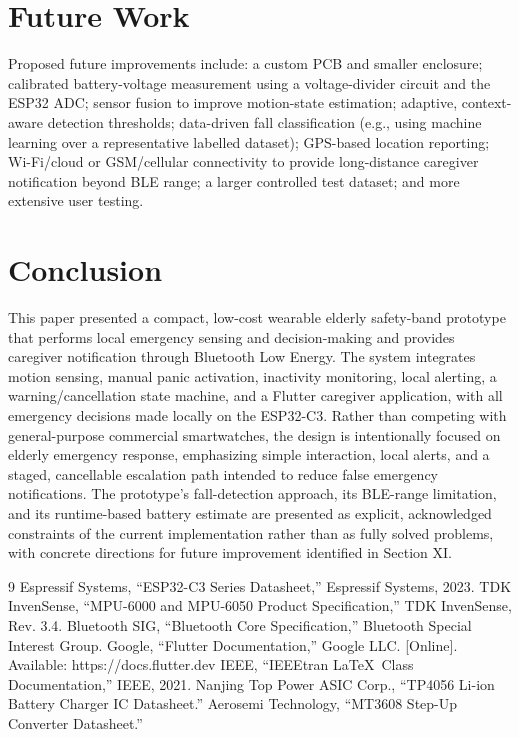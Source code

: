 \documentclass[lettersize,journal]{IEEEtran}
\begin{document}
\section{Future Work}
Proposed future improvements include: a custom PCB and smaller enclosure; calibrated battery-voltage measurement using a voltage-divider circuit and the ESP32 ADC; sensor fusion to improve motion-state estimation; adaptive, context-aware detection thresholds; data-driven fall classification (e.g., using machine learning over a representative labelled dataset); GPS-based location reporting; Wi-Fi/cloud or GSM/cellular connectivity to provide long-distance caregiver notification beyond BLE range; a larger controlled test dataset; and more extensive user testing.

\section{Conclusion}
This paper presented a compact, low-cost wearable elderly safety-band prototype that performs local emergency sensing and decision-making and provides caregiver notification through Bluetooth Low Energy. The system integrates motion sensing, manual panic activation, inactivity monitoring, local alerting, a warning/cancellation state machine, and a Flutter caregiver application, with all emergency decisions made locally on the ESP32-C3. Rather than competing with general-purpose commercial smartwatches, the design is intentionally focused on elderly emergency response, emphasizing simple interaction, local alerts, and a staged, cancellable escalation path intended to reduce false emergency notifications. The prototype's fall-detection approach, its BLE-range limitation, and its runtime-based battery estimate are presented as explicit, acknowledged constraints of the current implementation rather than as fully solved problems, with concrete directions for future improvement identified in Section XI.

\begin{thebibliography}{9}
 Espressif Systems, ``ESP32-C3 Series Datasheet,'' Espressif Systems, 2023.
 TDK InvenSense, ``MPU-6000 and MPU-6050 Product Specification,'' TDK InvenSense, Rev. 3.4.
 Bluetooth SIG, ``Bluetooth Core Specification,'' Bluetooth Special Interest Group.
 Google, ``Flutter Documentation,'' Google LLC. [Online]. Available: https://docs.flutter.dev
 IEEE, ``IEEEtran \LaTeX\ Class Documentation,'' IEEE, 2021.
 Nanjing Top Power ASIC Corp., ``TP4056 Li-ion Battery Charger IC Datasheet.''
 Aerosemi Technology, ``MT3608 Step-Up Converter Datasheet.''
\end{thebibliography}
\end{document}
